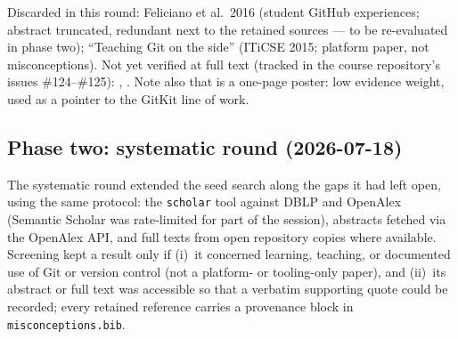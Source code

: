 Discarded in this round: Feliciano et al.\ 2016 (student GitHub
experiences; abstract truncated, redundant next to the retained sources
--- to be re-evaluated in phase two); \enquote{Teaching Git on the side}
(ITiCSE 2015; platform paper, not misconceptions).
Not yet verified at full text (tracked in the course repository's issues
\#124--\#125): \autocite{DuBoulay1981BlackBox},
\autocite{BenAri1998Constructivism}.
Note also that \autocite{Postner2026GitMisconceptions} is a one-page
poster: low evidence weight, used as a pointer to the GitKit line of work.

\subsection{Phase two: systematic round (2026-07-18)}

The systematic round extended the seed search along the gaps it had left
open, using the same protocol: the \texttt{scholar} tool against DBLP and
OpenAlex (Semantic Scholar was rate-limited for part of the session),
abstracts fetched via the OpenAlex API, and full texts from open repository
copies where available.
Screening kept a result only if (i)~it concerned learning, teaching, or
documented use of Git or version control (not a platform- or tooling-only
paper), and (ii)~its abstract or full text was accessible so that a verbatim
supporting quote could be recorded; every retained reference carries a
provenance block in \texttt{misconceptions.bib}.

